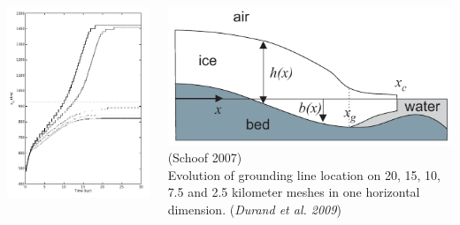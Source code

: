 \begin{frame}{}
  \begin{columns}
    \begin{column}{0.63\textwidth}
      \includegraphics[width=\textwidth]{figures/GroundingLine/MeshDependence}
    \end{column}
    \begin{column}{0.35\textwidth}
      {\centering\includegraphics[width=1.2\textwidth]{figures/GroundingLine/SchoofGeom} \\
      \footnotesize{(Schoof 2007)}} \\
      \bigskip
      \bigskip
      Evolution of grounding line location on 20, 15, 10, 7.5 and 2.5 kilometer
        meshes in one horizontal dimension.  \footnotesize{(\emph{Durand et al. 2009})}
    \end{column}
  \end{columns}
\end{frame}
